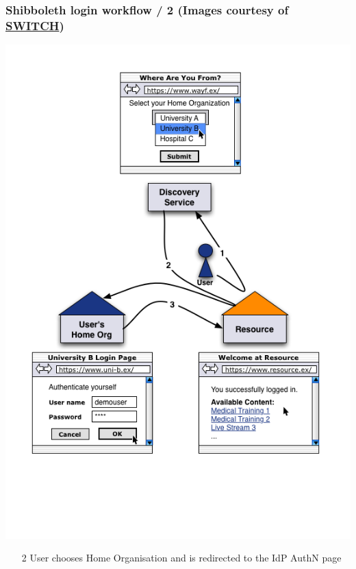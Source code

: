 \documentclass{beamer}
\newcommand{\+}{\vspace{1em}}
\begin{document}
\begin{frame}
  \frametitle{Shibboleth login workflow / 2
    \hfill%
    {\tiny (Images courtesy of 
      \href{http://www.switch.ch/aai/demo/2/medium.html}{SWITCH})}
  }
  \begin{center}
    \includegraphics[height=0.66\textheight]{simple_complete}
  \end{center}
  \begin{enumerate}
  \item[2] User chooses Home Organisation and is redirected to the IdP
    AuthN page
  \end{enumerate}
\end{frame}
\end{document}
